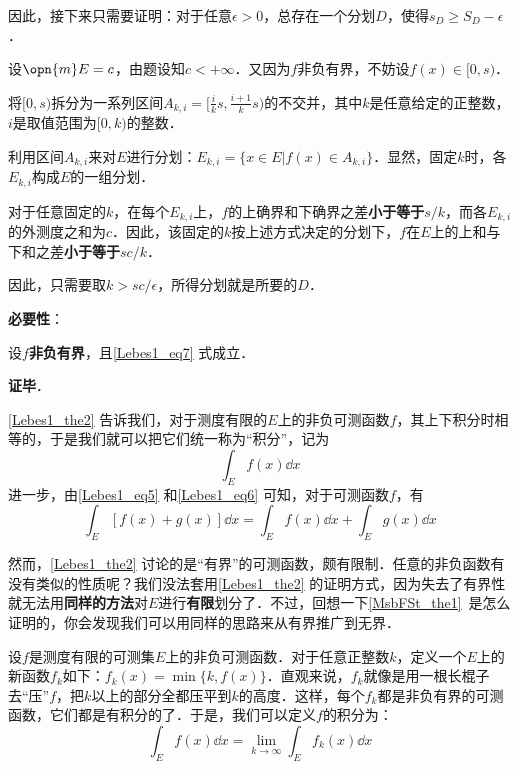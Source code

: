 因此，接下来只需要证明：对于任意$\epsilon>0$，总存在一个分划$D$，使得$s_D\geq S_D-\epsilon$．

设$\opn{m}E=c$，由题设知$c<+\infty$．又因为$f$非负有界，不妨设$f(x)\in [0, s)$．

将$[0, s)$拆分为一系列区间$A_{k, i}=[\frac{i}{k}s, \frac{i+1}{k}s)$的不交并，其中$k$是任意给定的正整数，$i$是取值范围为$[0, k)$的整数．

利用区间$A_{k, i}$来对$E$进行分划：$E_{k, i}=\{x\in E|f(x)\in A_{k, i}\}$．显然，固定$k$时，各$E_{k, i}$构成$E$的一组分划．

对于任意固定的$k$，在每个$E_{k, i}$上，$f$的上确界和下确界之差\textbf{小于等于}$s/k$，而各$E_{k, i}$的外测度之和为$c$．因此，该固定的$k$按上述方式决定的分划下，$f$在$E$上的上和与下和之差\textbf{小于等于}$sc/k$．

因此，只需要取$k>sc/\epsilon$，所得分划就是所要的$D$．

\textbf{必要性}：

设$f$\textbf{非负有界}，且\autoref{Lebes1_eq7} 式成立．




\textbf{证毕}．

\autoref{Lebes1_the2} 告诉我们，对于测度有限的$E$上的非负可测函数$f$，其上下积分时相等的，于是我们就可以把它们统一称为“积分”，记为
\begin{equation}
\int_E f(x) \dd x
\end{equation}
进一步，由\autoref{Lebes1_eq5} 和\autoref{Lebes1_eq6} 可知，对于可测函数$f$，有
\begin{equation}
\int_E [f(x)+g(x)] \dd x=\int_E f(x) \dd x+\int_E g(x) \dd x
\end{equation}

然而，\autoref{Lebes1_the2} 讨论的是“有界”的可测函数，颇有限制．任意的非负函数有没有类似的性质呢？我们没法套用\autoref{Lebes1_the2} 的证明方式，因为失去了有界性就无法用\textbf{同样的方法}对$E$进行\textbf{有限}划分了．不过，回想一下\autoref{MsbFSt_the1}~是怎么证明的，你会发现我们可以用同样的思路来从有界推广到无界．

设$f$是测度有限的可测集$E$上的非负可测函数．对于任意正整数$k$，定义一个$E$上的新函数$f_k$如下：$f_k(x)=\min \{k, f(x)\}$．直观来说，$f_k$就像是用一根长棍子去“压”$f$，把$k$以上的部分全都压平到$k$的高度．这样，每个$f_k$都是非负有界的可测函数，它们都是有积分的了．于是，我们可以定义$f$的积分为：
\begin{equation}
\int_E f(x) \dd x = \lim\limits_{k\to\infty} \int_E f_k(x) \dd x
\end{equation}

